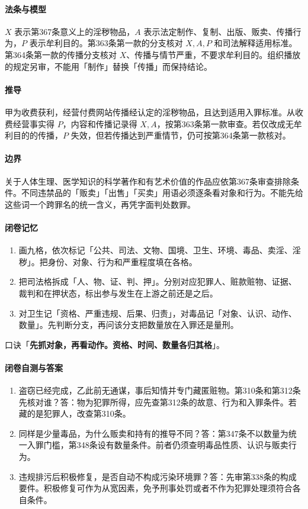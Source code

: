 \paragraph{法条与模型}
\(X\) 表示第367条意义上的淫秽物品，\(A\) 表示法定制作、复制、出版、贩卖、传播行为，\(P\) 表示牟利目的。第363条第一款的分支核对 \(X,A,P\) 和司法解释适用标准。第364条第一款的传播分支核对 \(X\)、传播与情节严重，不要求牟利目的。组织播放的规定另审，不能用「制作」替换「传播」而保持结论。

\paragraph{推导}
甲为收费获利，经营付费网站传播经认定的淫秽物品，且达到适用入罪标准。从收费经营事实得 \(P\)，内容和传播记录得 \(X,A\)，按第363条第一款审查。若仅改成无牟利目的的传播，\(P\) 失效，但若传播达到严重情节，仍可按第364条第一款核对。

\paragraph{边界}
关于人体生理、医学知识的科学著作和有艺术价值的作品应依第367条审查排除条件。不同违禁品的「贩卖」「出售」「买卖」用语必须逐条看对象和行为。不能先给这些词一个跨罪名的统一含义，再凭字面判处数罪。

\paragraph{闭卷记忆}
\begin{enumerate}
\item 画九格，依次标记「公共、司法、文物、国境、卫生、环境、毒品、卖淫、淫秽」。把身份、对象、行为和严重程度填在各格。
\item 把司法格拆成「人、物、证、判、押」。分别对应犯罪人、赃款赃物、证据、裁判和在押状态，标出参与发生在上游之前还是之后。
\item 对卫生记「资格、严重违规、后果、归责」，对毒品记「对象、认识、动作、数量」。先判断分支，再问该分支把数量放在入罪还是量刑。
\end{enumerate}
口诀「\textbf{先抓对象，再看动作。资格、时间、数量各归其格}」。

\paragraph{闭卷自测与答案}
\begin{enumerate}
\item 盗窃已经完成，乙此前无通谋，事后知情并专门藏匿赃物。第310条和第312条先核对谁？答：物为犯罪所得，应先查第312条的故意、行为和入罪条件。若藏的是犯罪人，改查第310条。
\item 同样是少量毒品，为什么贩卖和持有的推导不同？答：第347条不以数量为统一入罪门槛，第348条设有数量条件。前者仍须查明毒品性质、认识与贩卖行为。
\item 违规排污后积极修复，是否自动不构成污染环境罪？答：先审第338条的构成要件。积极修复可作为从宽因素，免予刑事处罚或者不作为犯罪处理须符合各自条件。
\end{enumerate}
